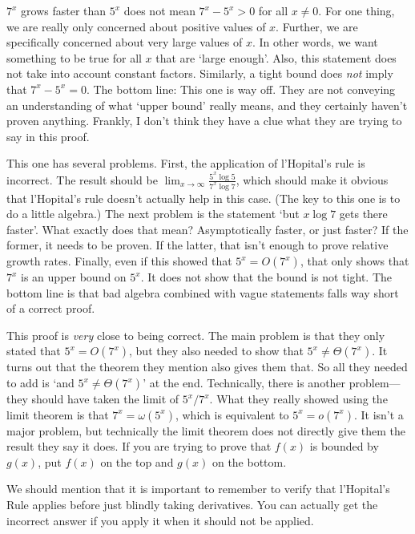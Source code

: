 \begin{eval}
\begin{spfenum}
\noindent
\evallinetwo
\end{spfenum}
\begin{answer}
\begin{pfevalenum}
\item
$7^x$ grows faster than $5^x$ does not mean $7^x-5^x>0$ for all $x\neq 0$.
For one thing, 
we are really only concerned about positive values of $x$.  
Further, we are specifically concerned about very large values of $x$.  
In other words, we want something to be true for all $x$ that are `large enough'.
Also, this statement does not take into account constant factors.  
Similarly, a tight bound does {\em not} imply that $7^x-5^x=0$.  
The bottom line:  This one is way off.  They are not conveying an understanding of
what `upper bound' really means, and they certainly haven't proven anything.
Frankly, I don't think they have a clue what they are trying to say in this proof.
\item
This one has several problems.  First, the application of l'Hopital's rule is incorrect.
The result should be $\displaystyle\lim_{x\rightarrow \infty}\frac{5^x\log 5}{7^x\log 7}$, 
which should make it obvious that l'Hopital's rule doesn't actually help in this case.
(The key to this one is to do a little algebra.)
The next problem is the statement `but $x\log 7$ gets there faster'.  
What exactly does that mean?
Asymptotically faster, or just faster?  If the former, it needs to be proven.  If the latter, that isn't enough to prove relative growth rates.  Finally, even if this showed that $5^x=O(7^x)$, that only shows
that $7^x$ is an upper bound on $5^x$.  It does not show that the bound is not tight.
The bottom line is that bad algebra combined with vague statements falls way short of
a correct proof.
\item
This proof is {\em very} close to being correct.  The main problem is that they only stated
that $5^x=O(7^x)$, but they also needed to show that $5^x\neq\Theta(7^x)$.  It turns out that the
theorem they mention also gives them that. So all they needed to add is `and $5^x\neq \Theta(7^x)$' at the end.
Technically, there is another problem---they should have taken the limit of $5^x/7^x$.  What they really showed
using the limit theorem is that $7^x=\omega(5^x)$, which is equivalent to $5^x=o(7^x)$.  It isn't a major problem,
but technically the limit theorem does not directly give them the result they say it does.  
If you are trying to prove that $f(x)$ is bounded by $g(x)$, put $f(x)$ on the top and $g(x)$ on the bottom.
\end{pfevalenum}
\end{answer}
\end{eval}
We should mention that it is important to remember to verify that l'Hopital's Rule applies
before just blindly taking derivatives. You can actually get the incorrect answer if
you apply it when it should not be applied.

